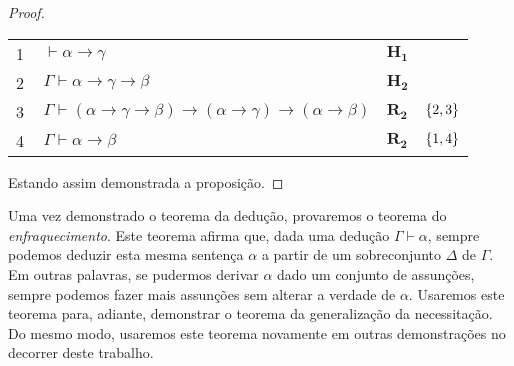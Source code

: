 \begin{tcolorbox}[enhanced jigsaw, breakable, sharp corners, colframe=black, colback=white, boxrule=0.5pt, left=1.5mm, right=1.5mm, top=1.5mm, bottom=1.5mm]
\begin{theorem}[Dedução]
\begin{proof}
\begin{case}
        \vspace{0.5\baselineskip}
        \footnotesize
        \setlength{\rowskip}{0.5\baselineskip}
        \begin{xltabular}{\textwidth}{r | X l l}
            \scriptsize{\phantom{0}1}\phantom{ } & $\ \vdash\alpha\to\gamma$                                                        & $\mathbf{H_1}$\phantom{1}                & \\[\rowskip]
            \scriptsize{\phantom{0}2}\phantom{ } & $\ \Gamma\vdash\alpha\to\gamma\to\beta$                                          & $\mathbf{H_2}$                           & \\[\rowskip]
            \scriptsize{\phantom{0}3}\phantom{ } & $\ \Gamma\vdash(\alpha\to\gamma\to\beta)\to(\alpha\to\gamma)\to(\alpha\to\beta)$ & $\hyperref[modal.rule.2]{\mathbf{R_2}}$  & $\left\{2,3\right\}$\\[\rowskip]
            \scriptsize{\phantom{0}4}\phantom{ } & $\ \Gamma\vdash\alpha\to\beta$                                                   & $\hyperref[modal.rule.2]{\mathbf{R_2}}$  & $\left\{1,4\right\}$
        \end{xltabular}
        \normalsize
        \end{case}

        \vspace{0.5\baselineskip}
        Estando assim demonstrada a proposição.
        \end{proof}
    \end{theorem}
    \end{tcolorbox}

    \vspace{.5\baselineskip}
    Uma vez demonstrado o teorema da dedução, provaremos o teorema do \emph{enfraquecimento}.
    Este teorema afirma que, dada uma dedução $\Gamma\vdash\alpha$, sempre podemos deduzir esta mesma sentença $\alpha$ a partir de um sobreconjunto $\Delta$ de $\Gamma$.
    Em outras palavras, se pudermos derivar $\alpha$ dado um conjunto de assunções, sempre podemos fazer mais assunções sem alterar a verdade de $\alpha$.
    Usaremos este teorema para, adiante, demonstrar o teorema da generalização da necessitação.
    Do mesmo modo, usaremos este teorema novamente em outras demonstrações no decorrer deste trabalho.

